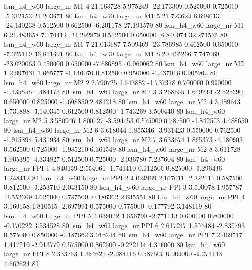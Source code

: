   lsm_h4_w60   large_nr       M1                 4 21.168728  5.975249 -22.173309 0.525000 0.725000 -5.312153   21.203671 80
  lsm_h4_w60   large_nr       M1                 5 21.723624  6.698613 -24.140238 0.512500 0.662500 -6.201178   27.191579 80
  lsm_h4_w60   large_nr       M1                 6 21.483658  7.170412 -24.292878 0.512500 0.650000 -6.840074   32.274535 80
  lsm_h4_w60   large_nr       M1                 7 21.013187  7.509469 -23.786985 0.462500 0.650000 -7.325119   36.811691 80
  lsm_h4_w60   large_nr       M1                 8 20.465266  7.747060 -23.020063 0.450000 0.650000 -7.686895   40.960062 80
  lsm_h4_w60   large_nr       M2                 1  2.997631  1.665777  -1.146076 0.812500 0.950000 -1.437016    0.905962 80
  lsm_h4_w60   large_nr       M2                 2  2.790725  1.543882  -1.737378 0.700000 0.900000 -1.435555    1.484173 80
  lsm_h4_w60   large_nr       M2                 3  3.268655  1.649214  -2.525290 0.650000 0.825000 -1.608850    2.481218 80
  lsm_h4_w60   large_nr       M2                 4  3.489643  1.731888  -3.140345 0.612500 0.812500 -1.743269    3.500440 80
  lsm_h4_w60   large_nr       M2                 5  3.580946  1.800127  -3.594453 0.575000 0.787500 -1.842503    4.488650 80
  lsm_h4_w60   large_nr       M2                 6  3.618044  1.855346  -3.931423 0.550000 0.762500 -1.915394    5.431934 80
  lsm_h4_w60   large_nr       M2                 7  3.633674  1.895373  -4.180903 0.562500 0.725000 -1.985210    6.361549 80
  lsm_h4_w60   large_nr       M2                 8  3.611728  1.905395  -4.334827 0.512500 0.725000 -2.036780    7.237604 80
  lsm_h4_w60   large_nr      PPI                 1  4.840159  2.554061  -1.741410 0.612500 0.825000 -0.296436    1.248412 80
  lsm_h4_w60   large_nr      PPI                 2  4.024969  2.167011  -2.322111 0.587500 0.812500 -0.253710    2.043150 80
  lsm_h4_w60   large_nr      PPI                 3  3.500078  1.957787  -2.552369 0.625000 0.787500 -0.186362    2.635551 80
  lsm_h4_w60   large_nr      PPI                 4  3.160158  1.810515  -2.697991 0.575000 0.775000 -0.177792    3.148109 80
  lsm_h4_w60   large_nr      PPI                 5  2.839022  1.656790  -2.771113 0.600000 0.800000 -0.170222    3.534528 80
  lsm_h4_w60   large_nr      PPI                 6  2.617247  1.504484  -2.839793 0.575000 0.850000 -0.187662    3.918244 80
  lsm_h4_w60   large_nr      PPI                 7  2.469717  1.417219  -2.913779 0.575000 0.862500 -0.222114    4.316000 80
  lsm_h4_w60   large_nr      PPI                 8  2.333753  1.354621  -2.984116 0.587500 0.900000 -0.274143    4.662624 80
